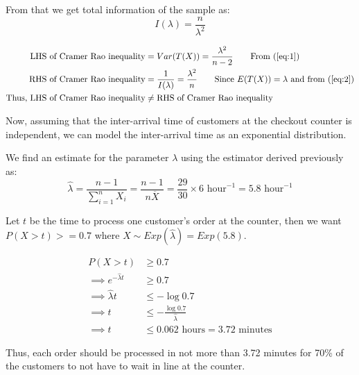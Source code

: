 \documentclass[12pt, oneside]{article}
\begin{document}
\begin{enumerate}
{  From that we get total information of the sample as:
  \begin{equation}
    I(\lambda) = \frac{n}{\lambda^2} \label{eq:2}
  \end{equation}

  \begin{align*}
    \text{LHS of Cramer Rao inequality} &= Var(T(X)) = \frac{\lambda^2}{n - 2} \tag*{From (\ref{eq:1})} \\
    \text{RHS of Cramer Rao inequality} &= \frac{1}{I(\lambda)} = \frac{\lambda^2}{n} \tag*{Since \(E(T(X)) = \lambda\) and from (\ref{eq:2})} \\
    \text{Thus, LHS of Cramer Rao inequality} &\neq \text{RHS of Cramer Rao inequality}
  \end{align*}

  Now, assuming that the inter-arrival time of customers at the checkout counter is independent,
  we can model the inter-arrival time as an exponential distribution.

  We find an estimate for the parameter \(\lambda\) using the estimator derived previously as:
  \[\widehat{\lambda} = \frac{n - 1}{\sum_{i=1}^{n} X_i} = \frac{n - 1}{n \overline{X}} = \frac{29}{30} \times 6 \text{ hour}^{-1} = 5.8 \text{ hour}^{-1}\]

  Let \(t\) be the time to process one customer's order at the counter, then we want
  \(P(X > t) >= 0.7\) where \(X \sim Exp(\widehat{\lambda}) = Exp(5.8)\).

  \begin{align*}
    P(X > t) &\geq 0.7 \\
    \implies e^{-\widehat{\lambda} t} &\geq 0.7 \\
    \implies \widehat{\lambda} t &\leq -\log{0.7} \\
    \implies t &\leq -\frac{\log{0.7}}{\widehat{\lambda}} \\
    \implies t &\leq 0.062 \text{ hours} = 3.72 \text{ minutes}
  \end{align*}

  Thus, each order should be processed in not more than 3.72 minutes for 70\% of the
  customers to not have to wait in line at the counter.
}


\end{enumerate}
\end{document}
